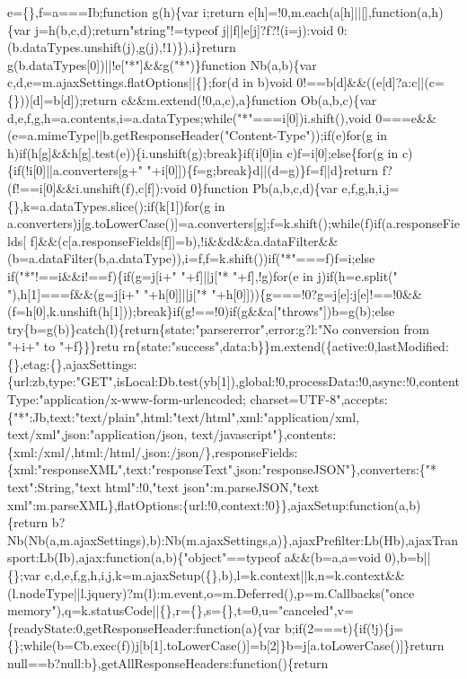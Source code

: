 \begin{DoxyCode}
{       e=\{\},f=a===Ib;function g(h)\{var i;return e[h]=!0,m.each(a[h]||[],function(a,h)\{var j=h(b,c,d);return"string"!=typeof
       j||f||e[j]?f?!(i=j):void 0:(b.dataTypes.unshift(j),g(j),!1)\}),i\}return g(b.dataTypes[0])||!e["*"]&&g("*")\}function
       Nb(a,b)\{var c,d,e=m.ajaxSettings.flatOptions||\{\};for(d in b)void 0!==b[d]&&((e[d]?a:c||(c=\{\}))[d]=b[d]);return
       c&&m.extend(!0,a,c),a\}function Ob(a,b,c)\{var
       d,e,f,g,h=a.contents,i=a.dataTypes;while("*"===i[0])i.shift(),void 0===e&&(e=a.mimeType||b.getResponseHeader("Content-Type"));if(e)for(g in
       h)if(h[g]&&h[g].test(e))\{i.unshift(g);break\}if(i[0]in c)f=i[0];else\{for(g in c)\{if(!i[0]||a.converters[g+"
       "+i[0]])\{f=g;break\}d||(d=g)\}f=f||d\}return f?(f!==i[0]&&i.unshift(f),c[f]):void 0\}function Pb(a,b,c,d)\{var
       e,f,g,h,i,j=\{\},k=a.dataTypes.slice();if(k[1])for(g in
       a.converters)j[g.toLowerCase()]=a.converters[g];f=k.shift();while(f)if(a.responseFields[
      f]&&(c[a.responseFields[f]]=b),!i&&d&&a.dataFilter&&(b=a.dataFilter(b,a.dataType)),i=f,f=k.shift())if("*"===f)f=i;else if("*"!==i&&i!==f)\{if(g=j[i+" "+f]||j["* "+f],!g)for(e in j)if(h=e.split(" "),h[1]===f&&(g=j[i+"
       "+h[0]]||j["*
       "+h[0]]))\{g===!0?g=j[e]:j[e]!==!0&&(f=h[0],k.unshift(h[1]));break\}if(g!==!0)if(g&&a["throws"])b=g(b);else try\{b=g(b)\}catch(l)\{return\{state:"parsererror",error:g?l:"No conversion from "+i+" to
       "+f\}\}\}retu
      rn\{state:"success",data:b\}\}m.extend(\{active:0,lastModified:\{\},etag:\{\},ajaxSettings:\{url:zb,type:"GET",isLocal:Db.test(yb[1]),global:!0,processData:!0,async:!0,contentType:"application/x-www-form-urlencoded;
       charset=UTF-8",accepts:\{"*":Jb,text:"text/plain",html:"text/html",xml:"application/xml,
       text/xml",json:"application/json,
       text/javascript"\},contents:\{xml:/xml/,html:/html/,json:/json/\},responseFields:\{xml:"responseXML",text:"responseText",json:"responseJSON"\},converters:\{"* text":String,"text html":!0,"text json":m.parseJSON,"text
       xml":m.parseXML\},flatOptions:\{url:!0,context:!0\}\},ajaxSetup:function(a,b)\{return
       b?Nb(Nb(a,m.ajaxSettings),b):Nb(m.ajaxSettings,a)\},ajaxPrefilter:Lb(Hb),ajaxTransport:Lb(Ib),ajax:function(a,b)\{"object"==typeof
       a&&(b=a,a=void 0),b=b||\{\};var
       c,d,e,f,g,h,i,j,k=m.ajaxSetup(\{\},b),l=k.context||k,n=k.context&&(l.nodeType||l.jquery)?m(l):m.event,o=m.Deferred(),p=m.Callbacks("once
       memory"),q=k.statusCode||\{\},r=\{\},s=\{\},t=0,u="canceled",v=\{readyState:0,getResponseHeader:function(a)\{var
       b;if(2===t)\{if(!j)\{j=\{\};while(b=Cb.exec(f))j[b[1].toLowerCase()]=b[2]\}b=j[a.toLowerCase()]\}return null==b?null:b\},getAllResponseHeaders:function()\{return
}
\end{DoxyCode}
